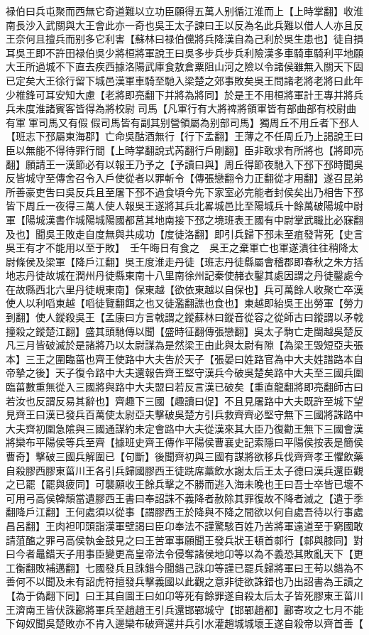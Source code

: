 禄伯曰兵屯聚而西無它奇道難以立功臣願得五萬人别循江淮而上【上時掌翻】收淮南長沙入武關與大王會此亦一奇也吳王太子諫曰王以反為名此兵難以借人人亦且反王奈何且擅兵而别多它利害【蘇林曰禄伯儻將兵降漢自為己利於吳生患也】徒自損耳吳王即不許田禄伯吳少將桓將軍說王曰吳多步兵步兵利險漢多車騎車騎利平地願大王所過城不下直去疾西據洛陽武庫食敖倉粟阻山河之險以令諸侯雖無入關天下固已定矣大王徐行留下城邑漢軍車騎至馳入梁楚之郊事敗矣吳王問諸老將老將曰此年少椎鋒可耳安知大慮【老將即亮翻下并將為將同】於是王不用桓將軍計王專并將兵兵未度淮諸賓客皆得為將校尉司馬【凡軍行有大將禆將領軍皆有部曲部有校尉曲有軍軍司馬又有假假司馬皆有副其别營領屬為别部司馬】獨周丘不用丘者下邳人【班志下邳屬東海郡】亡命吳酤酒無行【行下孟翻】王薄之不任周丘乃上謁說王曰臣以無能不得待罪行間【上時掌翻說式芮翻行戶剛翻】臣非敢求有所將也【將即亮翻】願請王一漢節必有以報王乃予之【予讀曰與】周丘得節夜馳入下邳下邳時聞吳反皆城守至傳舍召令入戶使從者以罪斬令【傳張戀翻令力正翻從才用翻】遂召昆弟所善豪吏吿曰吳反兵且至屠下邳不過食頃今先下家室必完能者封侯矣出乃相吿下邳皆下周丘一夜得三萬人使人報吳王遂將其兵北畧城邑比至陽城兵十餘萬破陽城中尉軍【陽城漢書作城陽城陽國都莒其地南接下邳之境班表王國有中尉掌武職比必寐翻及也】聞吳王敗走自度無與共成功【度徒洛翻】即引兵歸下邳未至疽發背死【史言吳王有才不能用以至于敗】　壬午晦日有食之　吳王之棄軍亡也軍遂潰往往稍降太尉條侯及梁軍【降戶江翻】吳王度淮走丹徒【班志丹徒縣屬會稽郡即春秋之朱方括地志丹徒故城在潤州丹徒縣東南十八里南徐州記秦使赭衣鑿其處因謂之丹徒鑿處今在故縣西北六里丹徒峴東南】保東越【欲依東越以自保也】兵可萬餘人收聚亡卒漢使人以利㗖東越【㗖徒覽翻餌之也又徒濫翻譙也食也】東越即紿吳王出勞軍【勞力到翻】使人鏦殺吳王【孟康曰方言戟謂之鏦蘇林曰鏦音從容之從師古曰鏦謂以矛戟撞殺之鏦楚江翻】盛其頭馳傳以聞【盛時征翻傳張戀翻】吳太子駒亡走閩越吳楚反凡三月皆破滅於是諸將乃以太尉謀為是然梁王由此與太尉有隙【為梁王毁短亞夫張本】三王之圍臨菑也齊王使路中大夫吿於天子【張晏曰姓路官為中大夫姓譜路本自帝摯之後】天子復令路中大夫還報告齊王堅守漢兵今破吳楚矣路中大夫至三國兵圍臨菑數重無從入三國將與路中大夫盟曰若反言漢已破矣【重直龍翻將即亮翻師古曰若汝也反謂反易其辭也】齊趣下三國【趣讀曰促】不且見屠路中大夫既許至城下望見齊王曰漢已發兵百萬使太尉亞夫擊破吳楚方引兵救齊齊必堅守無下三國將誅路中大夫齊初圍急隂與三國通謀約未定會路中大夫從漢來其大臣乃復勸王無下三國會漢將欒布平陽侯等兵至齊【據班史齊王傳作平陽侯曹襄史記索隱曰平陽侯按表是簡侯曹奇】擊破三國兵解圍已【句斷】後聞齊初與三國有謀將欲移兵伐齊齊孝王懼飲藥自殺膠西膠東菑川王各引兵歸國膠西王徒跣席藁飲水謝太后王太子德曰漢兵還臣觀之已罷【罷與疲同】可襲願收王餘兵擊之不勝而逃入海未晚也王曰吾士卒皆已壞不可用弓高侯韓頹當遺膠西王書曰奉詔誅不義降者赦除其罪復故不降者滅之【遺于季翻降戶江翻】王何處須以從事【謂膠西王於降與不降之間欲以何自處吾待以行事處昌呂翻】王肉袒叩頭詣漢軍壁謁曰臣卬奉法不謹驚駭百姓乃苦將軍遠道至于窮國敢請菹醢之罪弓高侯執金鼓見之曰王苦軍事願聞王發兵狀王頓首䣛行【䣛與膝同】對曰今者鼂錯天子用事臣變更高皇帝法令侵奪諸侯地卬等以為不義恐其敗亂天下【更工衡翻敗補邁翻】七國發兵且誅錯今聞錯己誅卬等謹已罷兵歸將軍曰王苟以錯為不善何不以聞及未有詔虎符擅發兵擊義國以此觀之意非徒欲誅錯也乃出詔書為王讀之【為于偽翻下同】曰王其自圖王曰如卬等死有餘罪遂自殺太后太子皆死膠東王菑川王濟南王皆伏誅酈將軍兵至趙趙王引兵還邯鄲城守【邯鄲趙都】酈寄攻之七月不能下匈奴聞吳楚敗亦不肯入邊欒布破齊還并兵引水灌趙城城壞王遂自殺帝以齊首善【